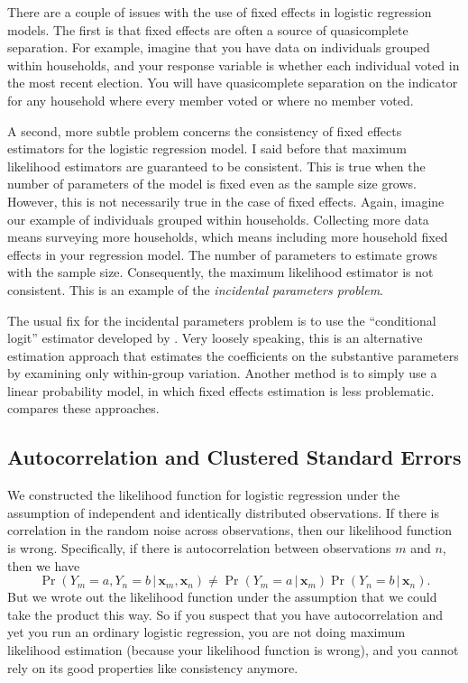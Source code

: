 \documentclass[
  12pt,
  oneside,openany]{book}
\begin{document}
There are a couple of issues with the use of fixed effects in logistic regression models.
The first is that fixed effects are often a source of quasicomplete separation.
For example, imagine that you have data on individuals grouped within households, and your response variable is whether each individual voted in the most recent election.
You will have quasicomplete separation on the indicator for any household where every member voted or where no member voted.

A second, more subtle problem concerns the consistency of fixed effects estimators for the logistic regression model.
I said before that maximum likelihood estimators are guaranteed to be consistent.
This is true when the number of parameters of the model is fixed even as the sample size grows.
However, this is not necessarily true in the case of fixed effects.
Again, imagine our example of individuals grouped within households.
Collecting more data means surveying more households, which means including more household fixed effects in your regression model.
The number of parameters to estimate grows with the sample size.
Consequently, the maximum likelihood estimator is not consistent.
This is an example of the \emph{incidental parameters problem}.

The usual fix for the incidental parameters problem is to use the ``conditional logit'' estimator developed by \citet{chamberlain1980analysis}.
Very loosely speaking, this is an alternative estimation approach that estimates the coefficients on the substantive parameters by examining only within-group variation.
Another method is to simply use a linear probability model, in which fixed effects estimation is less problematic.
\citet{beck2018estimating} compares these approaches.

\hypertarget{autocorrelation-and-clustered-standard-errors}{%
\subsection{Autocorrelation and Clustered Standard Errors}\label{autocorrelation-and-clustered-standard-errors}}

We constructed the likelihood function for logistic regression under the assumption of independent and identically distributed observations.
If there is correlation in the random noise across observations, then our likelihood function is wrong.
Specifically, if there is autocorrelation between observations \(m\) and \(n\), then we have
\[
\Pr(Y_m = a, Y_n = b \,|\, \mathbf{x}_m, \mathbf{x}_n)
\neq \Pr(Y_m = a \,|\, \mathbf{x}_m) \Pr(Y_n = b \,|\, \mathbf{x}_n).
\]
But we wrote out the likelihood function under the assumption that we could take the product this way.
So if you suspect that you have autocorrelation and yet you run an ordinary logistic regression, you are not doing maximum likelihood estimation (because your likelihood function is wrong), and you cannot rely on its good properties like consistency anymore.
\end{document}
